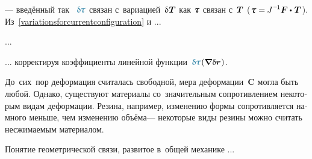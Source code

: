 \begin{otherlanguage}{russian}

\vspace{-0.2em}\noindent
--- введённый так ~${\varbivalent{\hspace{-0.2ex}\cauchystress}}$ связан с~вариацией~$\variation{\hspace{.1ex}\firstpiolakirchhoffstress}$ как $\cauchystress$ связан с~$\bm{T}$ (${\cauchystress = \hspace{-0.1ex} J^{\hspace{.1ex}\expminusone} \bm{F} \dotp \hspace{.15ex} \firstpiolakirchhoffstress\hspace{.2ex}}$). Из~\eqref{variationsforcurrentconfiguration} и ...

...

... корректируя коэффициенты линейной функции~${\varbivalent{\hspace{-0.2ex}\cauchystress}\hspace{.15ex}(\boldnabla \hspace{.1ex} \variation{\currentlocationvector}\hspace{.1ex})}$.

\end{otherlanguage}



\label{section:internalconstraints}

\begin{otherlanguage}{russian}

До~сих~пор деформация считалась свободной, мера деформации~$\bm{C}$ могла быть любой.
Однако, существуют материалы со~значительным сопротивлением некоторым видам деформации.
Резина, например, изменению формы сопротивляется намного меньше, чем изменению объёма\:--- некоторые виды резины можно считать несжимаемым материалом.

Понятие геометрической связи, развитое в~общей механике ...

\end{otherlanguage}



